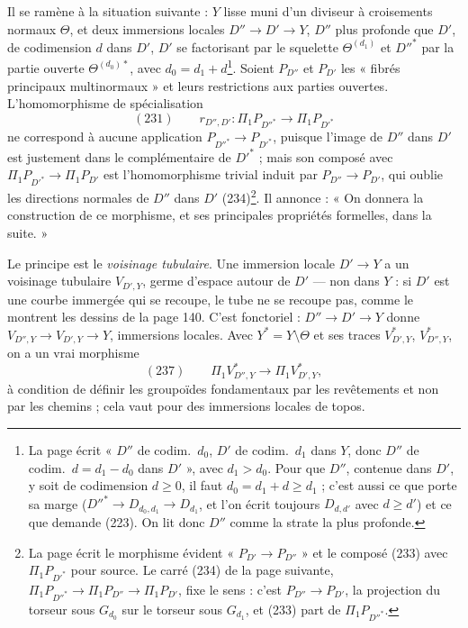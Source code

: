 \documentclass[11pt,a4paper]{article}
\begin{document}
Il se ramène à la situation suivante : $Y$ lisse muni d'un diviseur à croisements
normaux $\Theta$, et deux immersions locales $D'' \to D' \to Y$, $D''$ plus
profonde que $D'$, de codimension $d$ dans $D'$, $D'$ se factorisant par le
squelette $\Theta^{(d_1)}$ et $D''^{*}$ par la partie ouverte $\Theta^{(d_0)*}$,
avec $d_0 = d_1 + d$\footnote{La page écrit « $D''$ de codim.\ $d_0$, $D'$ de codim.\
$d_1$ dans $Y$, donc $D''$ de codim.\ $d = d_1 - d_0$ dans $D'$ », avec $d_1 >
d_0$. Pour que $D''$, contenue dans $D'$, y soit de codimension $d \geq 0$, il
faut $d_0 = d_1 + d \geq d_1$ ; c'est aussi ce que porte sa marge
($D''^{*} \to D_{d_0, d_1} \to D_{d_1}$, et l'on écrit toujours $D_{d,d'}$ avec $d
\geq d'$) et ce que demande (223). On lit donc $D''$ comme la strate la plus
profonde.}. Soient $P_{D''}$ et $P_{D'}$ les « fibrés principaux multinormaux » et
leurs restrictions aux parties ouvertes. L'homomorphisme de spécialisation
\[
(231) \qquad r_{D'',D'} : \Pi_1 P_{D''^{*}} \longrightarrow \Pi_1 P_{D'^{*}}
\]
ne correspond à aucune application $P_{D''^{*}} \to P_{D'^{*}}$, puisque l'image
de $D''$ dans $D'$ est justement dans le complémentaire de $D'^{*}$ ; mais son
composé avec $\Pi_1 P_{D'^{*}} \to \Pi_1 P_{D'}$ est l'homomorphisme trivial
induit par $P_{D''} \to P_{D'}$, qui oublie les directions normales de $D''$ dans
$D'$ (234)\footnote{La page écrit le morphisme évident « $P_{D'} \to P_{D''}$ » et
le composé (233) avec $\Pi_1 P_{D'^{*}}$ pour source. Le carré (234) de la page
suivante, $\Pi_1 P_{D''^{*}} \to \Pi_1 P_{D''} \to \Pi_1 P_{D'}$, fixe le sens :
c'est $P_{D''} \to P_{D'}$, la projection du torseur sous $G_{d_0}$ sur le
torseur sous $G_{d_1}$, et (233) part de $\Pi_1 P_{D''^{*}}$.}. Il annonce : « On
donnera la construction de ce morphisme, et ses principales propriétés formelles,
dans la suite. »

Le principe est le \emph{voisinage tubulaire}. Une immersion locale $D' \to Y$ a un
voisinage tubulaire $V_{D',Y}$, germe d'espace autour de $D'$ — non dans $Y$ : si
$D'$ est une courbe immergée qui se recoupe, le tube ne se recoupe pas, comme le
montrent les dessins de la page 140. C'est fonctoriel : $D'' \to D' \to Y$ donne
$V_{D'',Y} \to V_{D',Y} \to Y$, immersions locales. Avec $Y^* = Y \setminus \Theta$
et ses traces $V^{*}_{D',Y}$, $V^{*}_{D'',Y}$, on a un vrai morphisme
\[
(237) \qquad \Pi_1 V^{*}_{D'',Y} \longrightarrow \Pi_1 V^{*}_{D',Y},
\]
à condition de définir les groupoïdes fondamentaux par les revêtements et non par
les chemins ; cela vaut pour des immersions locales de topos.
\end{document}
